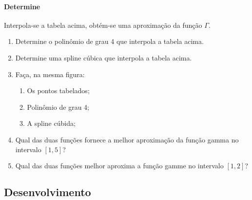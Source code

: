 \documentclass{article}
\begin{document}
            \paragraph{Determine}Interpola-se a tabela acima, obtém-se uma aproximação da função $\Gamma$.
                \begin{enumerate}[noitemsep]
                    \item Determine o polinômio de grau 4 que interpola a tabela acima.
                    \item Determine uma spline cúbica que interpola a tabela acima.
                    \item Faça, na mesma figura:
                        \begin{enumerate}[noitemsep]
                            \item Os pontos tabelados;
                            \item Polinômio de grau 4;
                            \item A spline cúbida;
                        \end{enumerate}
                    \item Qual das duas funções fornece a melhor aproximação da função gamma no intervalo $[1,5]$?
                    \item Qual das duas funções melhor aproxima a função gamme no intervalo $[1,2]$?
                \end{enumerate}

        \subsection{Desenvolvimento}
\end{document}
